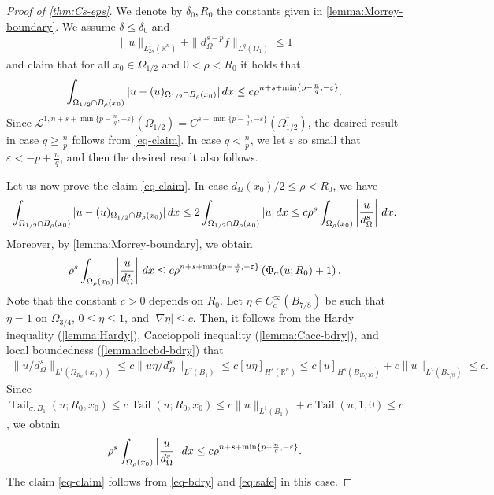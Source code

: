 \documentclass[11pt,reqno]{amsart}
\theoremstyle{plain}
\theoremstyle{definition}
\numberwithin{equation}{section}
\newcommand{\R}{\mathbb{R}}
\newcommand{\eps}{\varepsilon}
\newcommand{\1}{\mathbbm{1}}
\DeclareMathOperator{\tail}{Tail}
\renewcommand{\d}{\textnormal{\,d}}
\begin{document}
\begin{proof}[Proof of \autoref{thm:Cs-eps}]
We denote by $\delta_0, R_0$ the constants given in \autoref{lemma:Morrey-boundary}. We assume $\delta \leq \delta_0$ and
\begin{align*}
\|u\|_{L^1_{2s}(\R^n)} + \| d^{s-p}_{\Omega} f\|_{L^q(\Omega_1)} \leq 1
\end{align*}
and claim that for all $x_0 \in \Omega_{1/2}$ and $0<\rho< R_0$ it holds that
\begin{align}\label{eq-claim}
\int_{\Omega_{1/2} \cap B_\rho(x_0)} |u - (u)_{\Omega_{1/2}\cap B_\rho(x_0)}| \d x \leq c \rho^{n + s + \min \{p -\frac{n}{q}, - \eps\} }.
\end{align}
Since $\mathcal{L}^{1,n + s + \min \{p -\frac{n}{q}, - \eps\} }(\Omega_{1/2}) = C^{s+\min\{p-\frac{n}{q}, - \eps\}}(\overline{\Omega_{1/2}})$, the desired result in case $q \ge \frac{n}{p}$ follows from \eqref{eq-claim}. In case $q < \frac{n}{p}$, we let $\eps$ so small that $\varepsilon < -p + \frac{n}{q}$, and then the desired result also follows.

Let us now prove the claim \eqref{eq-claim}. In case $d_\Omega(x_0)/2 \leq \rho< R_0$, we have
\begin{align}\label{eq-bdry}
\int_{\Omega_{1/2} \cap B_\rho(x_0)} |u - (u)_{\Omega_{1/2}\cap B_\rho(x_0)}| \d x \leq 2\int_{\Omega_{1/2} \cap B_\rho(x_0)} |u| \d x \leq c \rho^{s} \int_{\Omega_\rho(x_0)} \left| \frac{u}{d_\Omega^s} \right| \d x.
\end{align}
Moreover, by \autoref{lemma:Morrey-boundary},  we obtain
\begin{align*}
\rho^{s} \int_{\Omega_\rho(x_0)} \left| \frac{u}{d_\Omega^s} \right| \d x \le c \rho^{n +s + \min \{p -\frac{n}{q}, - \eps\} } \left( \Phi_{\sigma}(u; R_0) + 1 \right).
\end{align*}
Note that the constant $c > 0$ depends on $R_0$. Let $\eta \in C^\infty_c(B_{7/8})$ be such that $\eta=1$ on $\Omega_{3/4}$, $0\leq \eta \leq 1$, and $|\nabla \eta|\leq c$. Then, it follows from the Hardy inequality (\autoref{lemma:Hardy}), Caccioppoli inequality (\autoref{lemma:Cacc-bdry}), and local boundedness (\autoref{lemma:locbd-bdry}) that
\begin{align*}
    \|u/d_\Omega^s\|_{L^1(\Omega_{R_0}(x_0))} \leq c\|u\eta/d_\Omega^s\|_{L^2(B_1)} \leq c[u\eta]_{H^s(\R^n)}
    \leq c[u]_{H^s(B_{15/16})} + c\|u\|_{L^2(B_{7/8})} \leq c.
\end{align*}
Since $\tail_{\sigma,B_1}(u;R_0,x_0) \le c \tail(u;R_0,x_0) \leq c \|u\|_{L^1(B_1)} + c\tail(u;1,0) \leq c$, we obtain
\begin{align}\label{eq:safe}
    \rho^{s} \int_{\Omega_\rho(x_0)} \left| \frac{u}{d_\Omega^s} \right| \d x \leq c\rho^{n +s +\min \{p -\frac{n}{q}, - \eps \} }.
\end{align}
The claim \eqref{eq-claim} follows from \eqref{eq-bdry} and \eqref{eq:safe} in this case.


\end{proof}
\end{document}
